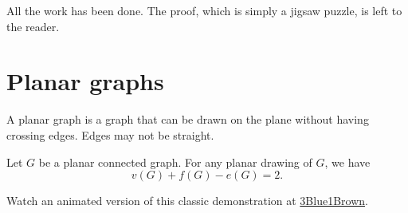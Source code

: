 \begin{dem}
	All the work has been done. The proof, which is simply a jigsaw puzzle, is left to the reader.
\end{dem}

\newpage
\section{Planar graphs}

\begin{defn}
	A planar graph is a graph that can be drawn on the plane without having crossing edges. Edges may not be straight.
\end{defn}

\begin{lem}[$V + F - E = 2$]
	Let $G$ be a planar connected graph. For any planar drawing of $G$, we have \[
		v(G) + f(G) - e(G) = 2.
	\]
\end{lem}

	Watch an animated version of this classic demonstration at \href{https://youtu.be/VvCytJvd4H0?t=382}{3Blue1Brown}.

